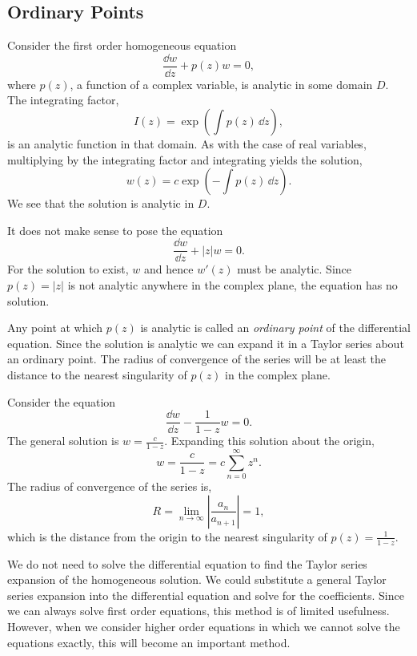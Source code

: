 \subsection{Ordinary Points}




Consider the first order homogeneous equation
\[ 
\frac{\dd w}{\dd z} + p(z) w = 0, 
\]
where $p(z)$, a function of a complex variable, is analytic in some domain $D$.
The integrating factor,
\[ 
I(z) = \exp \left( \int p(z) \,\dd z \right),
\]
is an analytic function in that domain.  As with the case of real variables, 
multiplying by the integrating factor and integrating yields the solution,
\[
w(z) = c \exp\left(-\int p(z)\,\dd z \right). 
\] 
We see that the solution is analytic in $D$. 





\begin{Example} 
  It does not make sense to pose the equation
  \[ \frac{\dd w}{\dd z} + |z| w = 0. \]
  For the solution to exist, $w$ and hence $w'(z)$ must be analytic.  
  Since $p(z) = |z|$ is not analytic anywhere in the complex plane, the
  equation has no solution.
\end{Example}




Any point at which $p(z)$ is analytic is called an \textit{ordinary point} 
of the differential equation.
Since the solution is analytic we can expand it in a Taylor series about
an ordinary point. The radius of convergence of the series will be at least the 
distance to the nearest singularity of $p(z)$ in the complex plane.




\begin{Example} 
  \label{ssrp_expand_solution}
  Consider the equation
  \[ 
  \frac{\dd w}{\dd z} - \frac{1}{1-z} w = 0.
  \]
  The general solution is $w = \frac{c}{1-z}.$  Expanding this solution 
  about the origin,
  \[ 
  w = \frac{c}{1-z} = c\sum_{n=0}^\infty z^n.
  \]
  The radius of convergence of the series is,
  \[
  R = \lim_{n \to \infty} \left|\frac{a_n}{a_{n+1}} \right| = 1,
  \]
  which is the distance from the origin to the nearest singularity of 
  $p(z) = \frac{1}{1-z}$.
\end{Example}




We do not need to solve the differential equation to find the Taylor series
expansion of the homogeneous solution.  
We could substitute a general Taylor series expansion into
the differential equation and solve for the coefficients.  Since we can 
always solve first order equations, this method is of limited usefulness.
However, when we consider higher order equations in which we cannot 
solve the equations exactly, this will become an important method.




